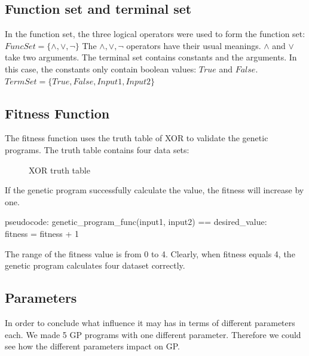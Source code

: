 \documentclass[11pt, a4paper, oneside, openright]{article}
\begin{document}
\subsection{Function set and terminal set}
In the function set, the three logical operators were used to form the function set:
\newline \hspace*{5cm} $FuncSet = \{\wedge, \vee, \lnot\}$
\newline The $\wedge, \vee, \lnot$ operators have their usual meanings. $\wedge$ and $\vee$ take two arguments. 
The terminal set contains constants and the arguments. In this case, the constants only contain boolean values: $True$ and $False$.
 \newline \hspace*{5cm} $TermSet = \{True, False, Input1, Input2\}$
\subsection{Fitness Function}
The fitness function uses the truth table of XOR to validate the genetic programs. The truth table contains four data sets:
  \begin{figure}[!ht]
  \centerline{}
  \caption{XOR truth table}
  \label{fig:xortruth}
  \end{figure}
\newline If the genetic program successfully calculate the value, the fitness will increase by one. 

\begin{program}
\mbox{pseudocode:}
\hspace *{4cm} \IF genetic\_program\_func(input1, input2) == desired\_value:
 \\%
	\hspace*{5mm} fitness = fitness + 1
\end{program}
The range of the fitness value is from 0 to 4. Clearly, when fitness equals 4, the genetic program calculates four dataset correctly.

\subsection{Parameters}
In order to conclude what influence it may has in terms of different parameters each. We made 5 GP programs with one different parameter. Therefore we could see how the different parameters impact on GP.
\end{document}
